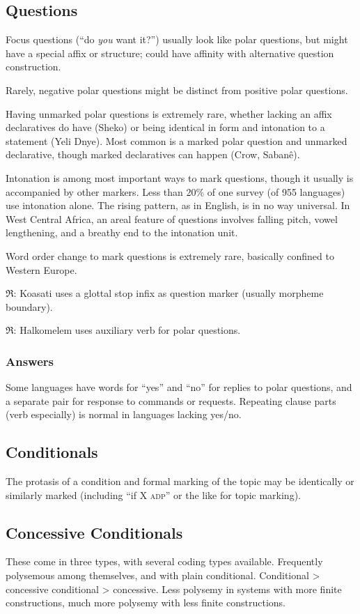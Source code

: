 \documentclass[11pt]{article}
\newcommand{\I}[1]{\textsc{#1}}   %
\newcommand{\rara}[1]{$\mathfrak{R}$: #1}
\begin{document}
\subsection{Questions}
Focus questions (``do \textit{you} want it?'') usually look like polar
questions, but might have a special affix or structure; could have
affinity with alternative question construction.

Rarely, negative polar questions might be distinct from positive polar
questions. 

Having unmarked polar questions is extremely rare, whether lacking an
affix declaratives do have (Sheko) or being identical in form and
intonation to a statement (Yeli Dnye).  Most common is a marked polar
question and unmarked declarative, though marked declaratives can
happen (Crow, Sabanê).

Intonation is among most important ways to mark questions, though it
usually is accompanied by other markers.  Less than 20\% of one survey
(of 955 languages) use intonation alone.  The rising pattern, as in
English, is in no way universal.  In West Central Africa, an areal
feature of questions involves falling pitch, vowel lengthening, and a
breathy end to the intonation unit.

Word order change to mark questions is extremely rare, basically
confined to Western Europe.

\rara{Koasati uses a glottal stop infix as question marker (usually
morpheme boundary).}

\rara{Halkomelem uses auxiliary verb for polar questions.}

\subsubsection{Answers}
Some languages have words for ``yes'' and ``no'' for replies to polar
questions, and a separate pair for response to commands or requests.
Repeating clause parts (verb especially) is normal in languages
lacking yes/no.



\subsection{Conditionals}
The protasis of a condition and formal marking of the topic may be
identically or similarly marked (including ``if X \I{adp}'' or the
like for topic marking).

\subsection{Concessive Conditionals}
These come in three types, with several coding types available.
Frequently polysemous among themselves, and with plain conditional.
Conditional > concessive conditional > concessive.  Less polysemy in
systems with more finite constructions, much more polysemy with less
finite constructions.
\end{document}
